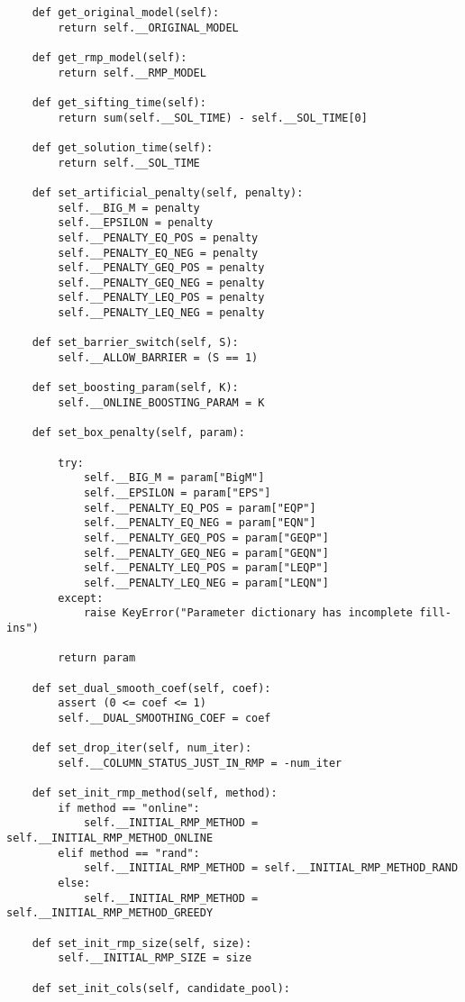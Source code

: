 \documentclass{article}
\begin{document}
\begin{lstlisting}
    def get_original_model(self):
        return self.__ORIGINAL_MODEL

    def get_rmp_model(self):
        return self.__RMP_MODEL

    def get_sifting_time(self):
        return sum(self.__SOL_TIME) - self.__SOL_TIME[0]

    def get_solution_time(self):
        return self.__SOL_TIME

    def set_artificial_penalty(self, penalty):
        self.__BIG_M = penalty
        self.__EPSILON = penalty
        self.__PENALTY_EQ_POS = penalty
        self.__PENALTY_EQ_NEG = penalty
        self.__PENALTY_GEQ_POS = penalty
        self.__PENALTY_GEQ_NEG = penalty
        self.__PENALTY_LEQ_POS = penalty
        self.__PENALTY_LEQ_NEG = penalty

    def set_barrier_switch(self, S):
        self.__ALLOW_BARRIER = (S == 1)

    def set_boosting_param(self, K):
        self.__ONLINE_BOOSTING_PARAM = K

    def set_box_penalty(self, param):

        try:
            self.__BIG_M = param["BigM"]
            self.__EPSILON = param["EPS"]
            self.__PENALTY_EQ_POS = param["EQP"]
            self.__PENALTY_EQ_NEG = param["EQN"]
            self.__PENALTY_GEQ_POS = param["GEQP"]
            self.__PENALTY_GEQ_NEG = param["GEQN"]
            self.__PENALTY_LEQ_POS = param["LEQP"]
            self.__PENALTY_LEQ_NEG = param["LEQN"]
        except:
            raise KeyError("Parameter dictionary has incomplete fill-ins")

        return param

    def set_dual_smooth_coef(self, coef):
        assert (0 <= coef <= 1)
        self.__DUAL_SMOOTHING_COEF = coef

    def set_drop_iter(self, num_iter):
        self.__COLUMN_STATUS_JUST_IN_RMP = -num_iter

    def set_init_rmp_method(self, method):
        if method == "online":
            self.__INITIAL_RMP_METHOD = self.__INITIAL_RMP_METHOD_ONLINE
        elif method == "rand":
            self.__INITIAL_RMP_METHOD = self.__INITIAL_RMP_METHOD_RAND
        else:
            self.__INITIAL_RMP_METHOD = self.__INITIAL_RMP_METHOD_GREEDY

    def set_init_rmp_size(self, size):
        self.__INITIAL_RMP_SIZE = size

    def set_init_cols(self, candidate_pool):


\end{lstlisting}
\end{document}
